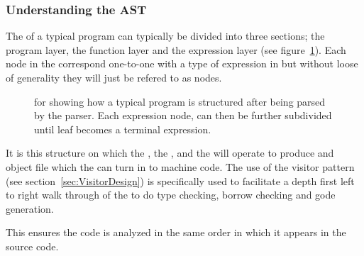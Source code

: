 \subsubsection{Understanding the AST}
\label{sec:AST}

The \ast{} of a typical \lang{} program can typically be divided into three
sections; the program layer, the function layer and the expression layer (see
figure~\ref{fig:astStruct}). Each node in the \ast{} correspond one-to-one with a
type of expression in \lang{} but without loose of generality they will just be
refered to as nodes.

\begin{figure}[ht]
  \centering
  \caption{\ast{} for \lang{} showing how a typical program is structured after
  being parsed by the \lang{} parser. Each expression node, can then be further
subdivided until leaf becomes a terminal expression.}
  \label{fig:astStruct}
\end{figure}

It is this structure on which the \typeChecker, the \borrowChecker, and the
\codeGen{} will operate to produce and object file which the \gcc{} can turn in to
machine code. The use of the visitor pattern (see section~\ref{sec:VisitorDesign}) is
specifically used to facilitate a depth first left to right walk through of the \ast{} to do
type checking, borrow checking and gode generation.

This ensures the code is analyzed in the same order in which it appears in the
source code.

